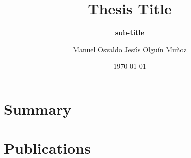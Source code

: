 \documentclass[electronic,oldfontcommands]{kthesis}
\begin{document}
\title{ Thesis Title }
\subtitle{\textbf{sub-title}}
\author{Manuel {Osvaldo Jesús} {Olguín Muñoz}}
\date{\today}
\address{%
	KTH Royal Institute of Technology\\%
	School of Electrical Engineering and Computer Science\\%
	Division of Information Science and Engineering\\%
	SE-10044 Stockholm\\%
	Sweden%
}

\maketitle

\frontmatter %






\mainmatter %

\tableofcontents*{}
\part{Summary}





\part{Publications}
\begin{appendices}
\ChNameVar{\rmfamily\Large}
\ChNumVar{\rmfamily\Huge\bfseries}
\ChTitleVar{\normalfont\rmfamily\Huge}
\renewcommand{\appendixname}{Paper}







\end{appendices}
\end{document}
